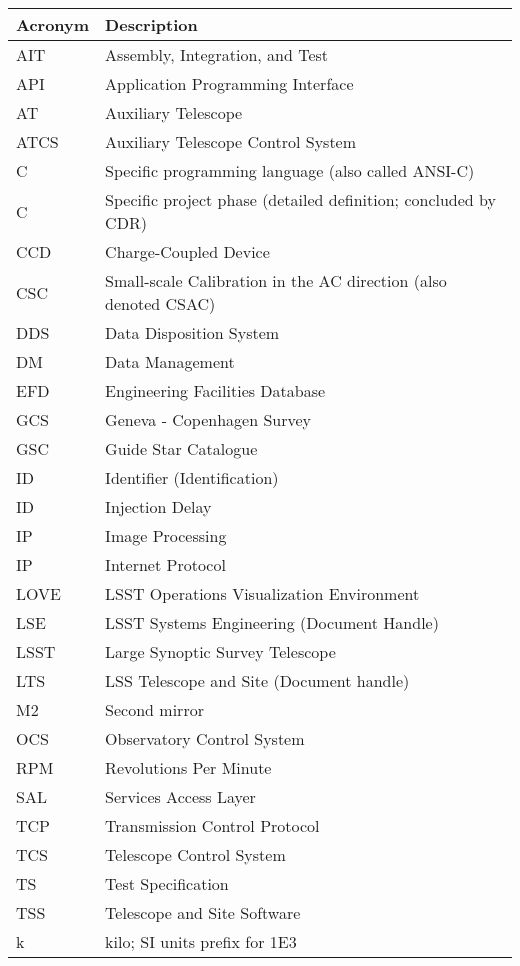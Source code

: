 \addtocounter{table}{-1}
\begin{longtable}{|l|p{}|}\hline
\textbf{Acronym} & \textbf{Description}  \\\hline

AIT & Assembly, Integration, and Test \\\hline
API & Application Programming Interface \\\hline
AT & Auxiliary Telescope \\\hline
ATCS & Auxiliary Telescope Control System \\\hline
C & Specific programming language (also called ANSI-C) \\\hline
C & Specific project phase (detailed definition; concluded by CDR) \\\hline
CCD & Charge-Coupled Device \\\hline
CSC & Small-scale Calibration in the AC direction (also denoted CSAC) \\\hline
DDS & Data Disposition System \\\hline
DM & Data Management \\\hline
EFD & Engineering Facilities Database \\\hline
GCS & Geneva - Copenhagen Survey \\\hline
GSC & Guide Star Catalogue \\\hline
ID & Identifier (Identification) \\\hline
ID & Injection Delay \\\hline
IP & Image Processing \\\hline
IP & Internet Protocol \\\hline
LOVE & LSST Operations Visualization Environment \\\hline
LSE & LSST Systems Engineering (Document Handle) \\\hline
LSST & Large Synoptic Survey Telescope \\\hline
LTS & LSS Telescope and Site (Document handle) \\\hline
M2 & Second mirror \\\hline
OCS & Observatory Control System \\\hline
RPM & Revolutions Per Minute \\\hline
SAL & Services Access Layer \\\hline
TCP & Transmission Control Protocol \\\hline
TCS & Telescope Control System \\\hline
TS & Test Specification \\\hline
TSS & Telescope and Site Software \\\hline
k & kilo; SI units prefix for 1E3 \\\hline
\end{longtable}

